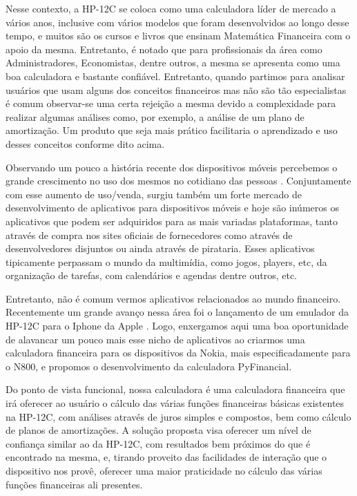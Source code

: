 Nesse contexto, a HP-12C se coloca como uma calculadora líder de mercado a vários anos, inclusive com vários modelos que foram desenvolvidos ao longo desse tempo, e muitos são os cursos e livros que ensinam Matemática Financeira com o apoio da mesma. Entretanto, é notado que para profissionais da área como Administradores, Economistas, dentre outros, a mesma se apresenta como uma boa calculadora e bastante confiável. Entretanto, quando partimos para analisar usuários que usam alguns dos conceitos financeiros mas não são tão especialistas é comum observar-se uma certa rejeição a mesma devido a complexidade para realizar algumas análises como, por exemplo, a análise de um plano de amortização. Um produto que seja mais prático facilitaria o aprendizado e uso desses conceitos conforme dito acima.

Observando um pouco a história recente dos dispositivos móveis percebemos o grande crescimento no uso dos mesmos no cotidiano das pessoas \cite{celular}. Conjuntamente com esse aumento de uso/venda, surgiu também um forte mercado de desenvolvimento de aplicativos para dispositivos móveis e hoje são inúmeros os aplicativos que podem ser adquiridos para as mais variadas plataformas, tanto através de compra nos sites oficiais de fornecedores como através de desenvolvedores disjuntos ou ainda através de pirataria. Esses aplicativos tipicamente perpassam o mundo da multimídia, como jogos, players, etc, da organização de tarefas, com calendários e agendas dentre outros, etc. 

Entretanto, não é comum vermos aplicativos relacionados ao mundo financeiro. Recentemente um grande avanço nessa área foi o lançamento de um emulador da HP-12C para o Iphone da Apple \cite{iphone}. Logo, enxergamos aqui uma boa oportunidade de alavancar um pouco mais esse nicho de aplicativos ao criarmos uma calculadora financeira para os dispositivos da Nokia, mais especificadamente para o N800, e propomos o desenvolvimento da calculadora PyFinancial. 

Do ponto de vista funcional, nossa calculadora é uma calculadora financeira que irá oferecer ao usuário o cálculo das várias funções financeiras básicas existentes na HP-12C, com análises através de juros simples e compostos, bem como cálculo de planos de amortizações.  A solução proposta visa oferecer um nível de confiança similar ao da HP-12C, com resultados bem próximos do que é encontrado na mesma, e, tirando proveito das facilidades de interação que o dispositivo nos provê, oferecer uma maior praticidade no cálculo das várias funções financeiras ali presentes.



